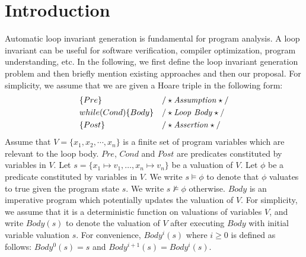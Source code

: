 
\section{Introduction} %
\label{sec:introduction}
Automatic loop invariant generation is fundamental for program analysis. A loop invariant can be useful for software verification, compiler optimization, program understanding, etc. In the following, we first define the loop invariant generation problem and then briefly mention existing approaches and then our proposal. For simplicity, we assume that we are given a Hoare triple in the following form:
\begin{align*}
&\{Pre\} & & /\star\text{\emph{Assumption}}\star/ \\
&while (Cond) \{ Body \} && /\star\text{\emph{Loop Body}}\star/\\
&\{Post\} & & /\star\text{\emph{Assertion}}\star/
\end{align*}
Assume that $V = \{x_1{,} x_2{,} \cdots{,} x_n\}$ is a finite set of program variables which are relevant to the loop body. $Pre$, $Cond$ and $Post$ are predicates constituted by variables in $V$.
Let $s = \{ x_1 \mapsto v_1, \ldots, x_n \mapsto v_n \}$ be a valuation of $V$. Let $\phi$ be a predicate constituted by variables in $V$. We write $s \models \phi$ to denote that $\phi$ valuates to true given the program state $s$. We write $s \not \models \phi$ otherwise.
$Body$ is an imperative program which potentially updates the valuation of $V$. For simplicity, we assume that it is a deterministic function on valuations of variables $V$, and write $Body(s)$ to denote the valuation of $V$ after executing $Body$ with initial variable valuation $s$. For convenience, $Body^i(s)$ where $i \geq 0$ is defined as follows: $Body^0(s) = s$ and $Body^{i+1}(s) = Body^i(s)$.

